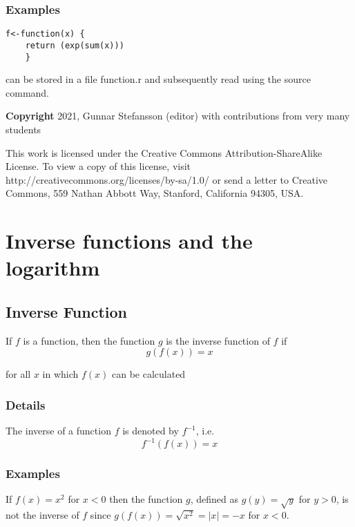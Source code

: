 \documentclass[12pt,a4paper]{article}
\theoremstyle{regla}
\theoremstyle{remark}
\theoremstyle{definition}
\theoremstyle{nonumberbreak}
\begin{document}
\subsubsection{Examples}
\begin{xmpl}

\begin{lstlisting}
f<-function(x) {
    return (exp(sum(x)))
    }
\end{lstlisting}
can be stored in a file function.r and
subsequently read using the source command.
\end{xmpl}

{\bf Copyright}
2021, Gunnar Stefansson (editor) with contributions from very many students

This work is licensed under the Creative Commons
Attribution-ShareAlike License. To view a copy of this license, visit
http://creativecommons.org/licenses/by-sa/1.0/ or send a letter to
Creative Commons, 559 Nathan Abbott Way, Stanford, California 94305,
USA.
\clearpage
\section{Inverse functions and the logarithm}
\subsection{Inverse Function}
\begin{fbox}
\begin{minipage}{0.97\textwidth}
If $f$ is a function, then the function $g$ is the inverse function of $f$ if 
$$g(f(x))=x$$

for all $x$ in which $f(x)$ can be calculated
\end{minipage}
\end{fbox}
\subsubsection{Details}
The inverse of a function $f$ is denoted by $f^{-1}$, i.e. $$f^{-1}(f(x))=x $$
\subsubsection{Examples}
\begin{xmpl}
If $f(x) = x^2$ for $x<0$
then the function $g$, defined as $g(y)=\sqrt{y}$ for $y>0$, is  not the inverse of $f$ since
$g(f(x))=\sqrt{x^2}= |x|= -x$ for $x<0$.

\end{xmpl}
\end{document}
